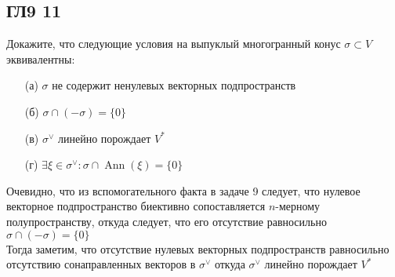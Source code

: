 \subsection*{ГЛ9 11}
Докажите, что следующие условия на выпуклый многогранный конус $\sigma \subset V$ эквивалентны:
\begin{enumerate}
\item[(а)] $\sigma$ не содержит ненулевых векторных подпространств
\item[(б)] $\sigma \cap(-\sigma)=\{0\}$
\item[(в)] $\sigma^{\vee}$ линейно порождает $V^{*}$
\item[(г)] $\exists \xi \in \sigma^{\vee}: \sigma \cap \operatorname{Ann}(\xi)=\{0\}$
\end{enumerate}
Очевидно, что из вспомогательного факта в задаче 9 следует, что нулевое векторное подпространство биективно сопоставляется $n$-мерному полупространству, откуда следует, что его отсутствие равносильно $\sigma \cap(-\sigma)=\{0\}$\\
Тогда заметим, что отсутствие нулевых векторных подпространств равносильно отсутствию сонаправленных векторов в $\sigma^{\vee}$ откуда $\sigma^{\vee}$ линейно порождает $V^{*}$
		